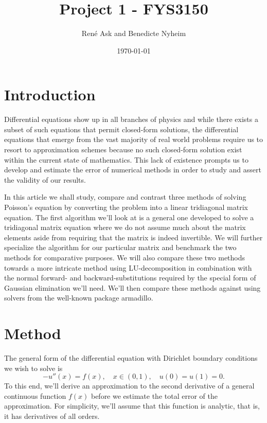 \documentclass[english,notitlepage]{revtex4-1}  %
\begin{document}
\title{Project 1 - FYS3150}      %
\author{René Ask and Benedicte Nyheim}          %
\date{\today}                             %
\noaffiliation                            %
\maketitle                                %

\section{Introduction}
Differential equations show up in all branches of physics and while there exists a subset of such equations that permit closed-form solutions, the differential equations that emerge from the vast majority of real world problems require us to resort to approximation schemes because no such closed-form solution exist within the current state of mathematics. This lack of existence prompts us to develop and estimate the error of numerical methods in order to study and assert the validity of our results. 

In this article we shall study, compare and contrast three methods of solving Poisson's equation by converting the problem into a linear tridiagonal matrix equation. The first algorithm we'll look at is a general one developed to solve a tridiagonal matrix equation where we do not assume much about the matrix elements aside from requiring that the matrix is indeed invertible. We will further specialize the algorithm for our particular matrix and benchmark the two methods for comparative purposes. We will also compare these two methods towards a more intricate method using LU-decomposition in combination with the normal forward- and backward-substitutions required by the special form of Gaussian elimination we'll need. We'll then compare these methods against using solvers from the well-known package armadillo.
\section{Method}
The general form of the differential equation with Dirichlet boundary conditions we wish to solve is 
\begin{equation}\label{diff_eq}
	-u''(x) = f(x), \quad x \in (0,1), \quad u(0)=u(1)=0.
\end{equation}
To this end, we'll derive an approximation to the second derivative of a general continuous function $f(x)$ before we estimate the total error of the approximation. For simplicity, we'll assume that this function is analytic, that is, it has derivatives of all orders.
\end{document}
